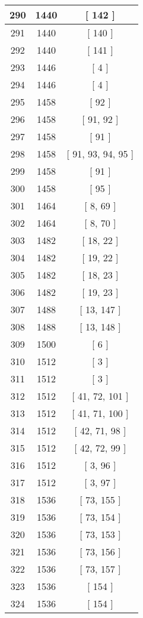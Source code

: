 \begin{center}
\begin{longtable}[H]{|| c c c ||}
\hline
290 & 1440 & [ 142 ] \\ 
\hline
291 & 1440 & [ 140 ] \\ 
\hline
292 & 1440 & [ 141 ] \\ 
\hline
293 & 1446 & [ 4 ] \\ 
\hline
294 & 1446 & [ 4 ] \\ 
\hline
295 & 1458 & [ 92 ] \\ 
\hline
296 & 1458 & [ 91, 92 ] \\ 
\hline
297 & 1458 & [ 91 ] \\ 
\hline
298 & 1458 & [ 91, 93, 94, 95 ] \\ 
\hline
299 & 1458 & [ 91 ] \\ 
\hline
300 & 1458 & [ 95 ] \\ 
\hline
301 & 1464 & [ 8, 69 ] \\ 
\hline
302 & 1464 & [ 8, 70 ] \\ 
\hline
303 & 1482 & [ 18, 22 ] \\ 
\hline
304 & 1482 & [ 19, 22 ] \\ 
\hline
305 & 1482 & [ 18, 23 ] \\ 
\hline
306 & 1482 & [ 19, 23 ] \\ 
\hline
307 & 1488 & [ 13, 147 ] \\ 
\hline
308 & 1488 & [ 13, 148 ] \\ 
\hline
309 & 1500 & [ 6 ] \\ 
\hline
310 & 1512 & [ 3 ] \\ 
\hline
311 & 1512 & [ 3 ] \\ 
\hline
312 & 1512 & [ 41, 72, 101 ] \\ 
\hline
313 & 1512 & [ 41, 71, 100 ] \\ 
\hline
314 & 1512 & [ 42, 71, 98 ] \\ 
\hline
315 & 1512 & [ 42, 72, 99 ] \\ 
\hline
316 & 1512 & [ 3, 96 ] \\ 
\hline
317 & 1512 & [ 3, 97 ] \\ 
\hline
318 & 1536 & [ 73, 155 ] \\ 
\hline
319 & 1536 & [ 73, 154 ] \\ 
\hline
320 & 1536 & [ 73, 153 ] \\ 
\hline
321 & 1536 & [ 73, 156 ] \\ 
\hline
322 & 1536 & [ 73, 157 ] \\ 
\hline
323 & 1536 & [ 154 ] \\ 
\hline
324 & 1536 & [ 154 ] \\ 
\hline

\end{longtable}
\end{center}
